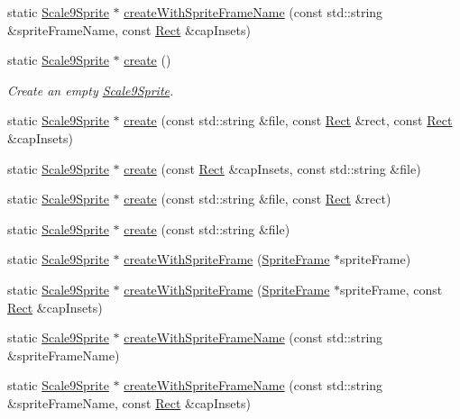 \begin{DoxyCompactItemize}
\item 
static \hyperlink{classui_1_1Scale9Sprite}{Scale9\+Sprite} $\ast$ \hyperlink{classui_1_1Scale9Sprite_ab417d698fb63900224c7693a8794f922}{create\+With\+Sprite\+Frame\+Name} (const std\+::string \&sprite\+Frame\+Name, const \hyperlink{classRect}{Rect} \&cap\+Insets)
\item 
static \hyperlink{classui_1_1Scale9Sprite}{Scale9\+Sprite} $\ast$ \hyperlink{classui_1_1Scale9Sprite_a2ea6cc4e7406fe2ce2559e3e7ada4ac0}{create} ()
\begin{DoxyCompactList}\small\item\em Create an empty \hyperlink{classui_1_1Scale9Sprite}{Scale9\+Sprite}. \end{DoxyCompactList}\item 
static \hyperlink{classui_1_1Scale9Sprite}{Scale9\+Sprite} $\ast$ \hyperlink{classui_1_1Scale9Sprite_a69ea085bb06187ba7f51180dd411010f}{create} (const std\+::string \&file, const \hyperlink{classRect}{Rect} \&rect, const \hyperlink{classRect}{Rect} \&cap\+Insets)
\item 
static \hyperlink{classui_1_1Scale9Sprite}{Scale9\+Sprite} $\ast$ \hyperlink{classui_1_1Scale9Sprite_a95b584b6ce63ac0f61d85e58e6563934}{create} (const \hyperlink{classRect}{Rect} \&cap\+Insets, const std\+::string \&file)
\item 
static \hyperlink{classui_1_1Scale9Sprite}{Scale9\+Sprite} $\ast$ \hyperlink{classui_1_1Scale9Sprite_aecd4dcbafbdb68543b068b0a4259c1b0}{create} (const std\+::string \&file, const \hyperlink{classRect}{Rect} \&rect)
\item 
static \hyperlink{classui_1_1Scale9Sprite}{Scale9\+Sprite} $\ast$ \hyperlink{classui_1_1Scale9Sprite_a981e5f6658862ff6d0d6032a5eaba2e6}{create} (const std\+::string \&file)
\item 
static \hyperlink{classui_1_1Scale9Sprite}{Scale9\+Sprite} $\ast$ \hyperlink{classui_1_1Scale9Sprite_a93d524a427de3b8b0fa1d8f8bff8cccf}{create\+With\+Sprite\+Frame} (\hyperlink{classSpriteFrame}{Sprite\+Frame} $\ast$sprite\+Frame)
\item 
static \hyperlink{classui_1_1Scale9Sprite}{Scale9\+Sprite} $\ast$ \hyperlink{classui_1_1Scale9Sprite_a551c0aff617e8ee2ba305fff991a0599}{create\+With\+Sprite\+Frame} (\hyperlink{classSpriteFrame}{Sprite\+Frame} $\ast$sprite\+Frame, const \hyperlink{classRect}{Rect} \&cap\+Insets)
\item 
static \hyperlink{classui_1_1Scale9Sprite}{Scale9\+Sprite} $\ast$ \hyperlink{classui_1_1Scale9Sprite_a96e532a82e63aa8e8e540b783b5ea632}{create\+With\+Sprite\+Frame\+Name} (const std\+::string \&sprite\+Frame\+Name)
\item 
static \hyperlink{classui_1_1Scale9Sprite}{Scale9\+Sprite} $\ast$ \hyperlink{classui_1_1Scale9Sprite_a25cf24a5bd98bfbce50ba7213e98841e}{create\+With\+Sprite\+Frame\+Name} (const std\+::string \&sprite\+Frame\+Name, const \hyperlink{classRect}{Rect} \&cap\+Insets)
\end{DoxyCompactItemize}
